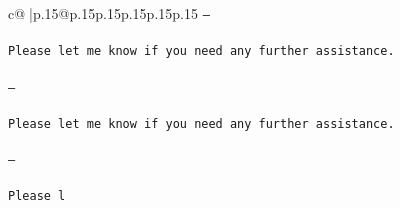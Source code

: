 \documentclass{article}
\begin{document}
{\begin{supertabular}{c@{$\;$}|p{.15\linewidth}@{}p{.15\linewidth}p{.15\linewidth}p{.15\linewidth}p{.15\linewidth}p{.15\linewidth}}
{{{\tt ---\\ \tt \\ \tt Please let me know if you need any further assistance. \\ \tt \\ \tt ---\\ \tt \\ \tt Please let me know if you need any further assistance. \\ \tt \\ \tt ---\\ \tt \\ \tt Please l}}}
\end{supertabular}}
\end{document}
